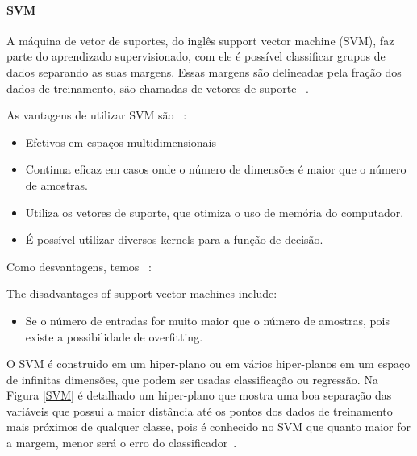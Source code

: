       \paragraph{SVM}

        A máquina de vetor de suportes, do inglês support vector machine (\acrshort{SVM}), faz parte do aprendizado supervisionado, com ele é possível
        classificar grupos de dados separando as suas margens. Essas margens são delineadas pela fração dos dados de treinamento, são chamadas de vetores de suporte ~\cite{chang2011libsvm}.

        As vantagens de utilizar \acrshort{SVM} são ~\cite{pedregosa2011scikit}:

        \begin{itemize}

          \item Efetivos em espaços multidimensionais
          \item Continua eficaz em casos onde o número de dimensões é maior que o número de amostras.
          \item Utiliza os vetores de suporte, que otimiza o uso de memória do computador.
          \item É possível utilizar diversos kernels para a função de decisão.

        \end{itemize}

        Como desvantagens, temos ~\cite{pedregosa2011scikit}:

        The disadvantages of support vector machines include:

        \begin{itemize}

          \item Se o número de entradas for muito maior que o número de amostras, pois existe a possibilidade de overfitting.

        \end{itemize}
        
        O \acrshort{SVM} é construido em um hiper-plano ou em vários hiper-planos em um espaço de infinitas dimensões, que podem ser
        usadas classificação ou regressão. Na Figura \ref{SVM} é detalhado um hiper-plano que mostra uma boa separação das variáveis
        que possui a maior distância até os pontos dos dados de treinamento mais próximos de qualquer classe, pois é conhecido no \acrshort{SVM}
        que quanto maior for a margem, menor será o erro do classificador~\cite{vieira2017plantrna_sniffer}. 
        
